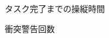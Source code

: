 \documentclass[a4paper,10pt,twocolumn,upLatex]{jsarticle}
\begin{document}
\begin{figure}[tb]
\begin{center}
  \vspace{-2mm}
  \caption{タスク完了までの操縦時間}
  \label{fig:time}
\end{center}
\end{figure}

\begin{figure}[tb]
\begin{center}
  \vspace{-2mm}
  \caption{衝突警告回数}
  \label{fig:collision}
\end{center}
\end{figure}
\end{document}
